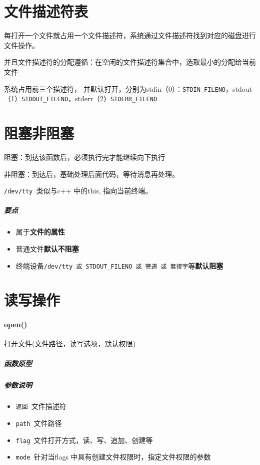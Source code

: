 \documentclass[UTF8,a4paper,12pt]{ctexbook}
\begin{document}
	\section{文件描述符表}
		每打开一个文件就占用一个文件描述符，系统通过文件描述符找到对应的磁盘进行文件操作。
		
		并且文件描述符的分配遵循：在空闲的文件描述符集合中，选取最小的分配给当前文件
	
		系统占用前三个描述符， 并默认打开，分别为stdin（0）：\verb|STDIN_FILENO|，stdout（1）\verb|STDOUT_FILENO|，stderr（2）\verb|STDERR_FILENO|
	
	\section{阻塞非阻塞}
		阻塞：到达该函数后，必须执行完才能继续向下执行
		
		非阻塞：到达后，基础处理后面代码，等待消息再处理。
		
		\verb|/dev/tty |类似与c++ 中的this, 指向当前终端。
		
		\subparagraph{要点}
			\begin{itemize}[itemindent = 1em]
				\item 属于\textbf{文件的属性}
				\item 普通文件\textbf{默认不阻塞}
				\item 终端设备\verb|/dev/tty 或 STDOUT_FILENO 或 管道 或 套接字|等\textbf{默认阻塞}
			\end{itemize}
		
	\section{读写操作}		
		\paragraph{open()}打开文件(文件路径，读写选项，默认权限)
			\subparagraph{函数原型}
				
			\subparagraph{参数说明}
				\begin{itemize}[itemindent = 1em]
					\item \verb|返回 |文件描述符
					\item \verb|path |文件路径
					\item \verb|flag |文件打开方式，读、写、追加、创建等
					\item \verb|mode |针对当flags 中具有创建文件权限时，指定文件权限的参数
				\end{itemize}
				
\end{document}
